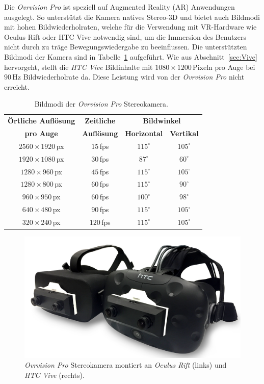 Die \emph{Ovrvision Pro} ist speziell auf Augmented Reality (AR) Anwendungen ausgelegt. So unterstützt die Kamera natives Stereo-3D und bietet auch Bildmodi mit hohen Bildwiederholraten, welche für die Verwendung mit VR-Hardware wie Oculus Rift oder HTC Vive notwendig sind, um die Immersion des Benutzers nicht durch zu träge Bewegungswiedergabe zu beeinflussen. Die unterstützten Bildmodi der Kamera sind in Tabelle~\ref{tab:ovrRes} aufgeführt. Wie aus Abschnitt~\ref{sec:Vive} hervorgeht, stellt die \textit{HTC Vive} Bildinhalte mit $1080\times1200$\,Pixeln pro Auge bei $90$\,Hz Bildwiederholrate da. Diese Leistung wird von der \emph{Ovrvision Pro} nicht erreicht.

\begin{table}
	\centering
	\begin{tabular}{|c|c|c|c|}
		\hline
		\Absatzbox{}
		\textbf{Örtliche Auflösung}& \textbf{Zeitliche} & \multicolumn{2}{c|}{\textbf{Bildwinkel}}\\
		\cline{3-4}
		\Absatzbox{}
		\textbf{pro Auge}& \textbf{Auflösung} & \textbf{Horizontal} & \textbf{Vertikal}\\
		\hline
		$2560\times1920$\,px & $15$\,fps & $115^\circ$ & $105^\circ$\\
		\hline
		$1920\times1080$\,px & $30$\,fps & $87^\circ$ & $60^\circ$\\
		\hline
		$1280\times960$\,px & $45$\,fps & $115^\circ$ & $105^\circ$\\
		\hline
		$1280\times800$\,px & $60$\,fps & $115^\circ$ & $90^\circ$\\
		\hline
		$960\times950$\,px & $60$\,fps & $100^\circ$ & $98^\circ$\\
		\hline
		$640\times480$\,px & $90$\,fps & $115^\circ$ & $105^\circ$\\
		\hline
		$320\times240$\,px & $120$\,fps & $115^\circ$ & $105^\circ$\\
		\hline
	\end{tabular}
	\caption{Bildmodi der \emph{Ovrvision Pro} Stereokamera.~\cite{website:ovrvisionProduct}}
	\label{tab:ovrRes}
\end{table}


\begin{figure}[H]
	\centering
	\includegraphics[width=\textwidth]{Bilder/ovr.jpg}			
		\caption{\emph{Ovrvision Pro} Stereokamera montiert an \emph{Oculus Rift} (links) und \emph{HTC Vive} (rechts).~\cite{website:ovrvision}}
		\label{fig:ovr}
\end{figure}
